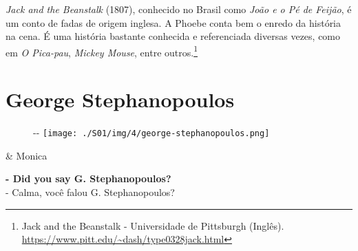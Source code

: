 \emph{Jack and the Beanstalk} (1807), conhecido no Brasil como
\emph{João e o Pé de Feijão}, é um conto de fadas de origem inglesa. A
Phoebe conta bem o enredo da história na cena. É uma história bastante
conhecida e referenciada diversas vezes, como em \emph{O Pica-pau},
\emph{Mickey Mouse}, entre outros.\footnote{\sloppy Jack and the Beanstalk - Universidade de Pittsburgh (Inglês). \url{https://www.pitt.edu/~dash/type0328jack.html}}

\hypertarget{george-stephanopoulos}{%
\section{George Stephanopoulos}\label{george-stephanopoulos}}

\begin{figure}[!ht]
  \begin{adjustwidth}{-\oddsidemargin-1in}{-\rightmargin}
    \centering
    \texttt{[image: ./S01/img/4/george-stephanopoulos.png]}
  \end{adjustwidth}
\end{figure}

\begin{tcolorbox}[enhanced,center upper,
    drop fuzzy shadow southeast, boxrule=0.3pt,
    lower separated=false,
    colframe=black!30!dialogoBorder,colback=white]
\begin{minipage}[c]{0.16\linewidth}
   & \centering \scriptsize{Monica}
\end{minipage}
\hfill
\begin{minipage}[c]{0.8\linewidth}
  \textbf{- Did you say G. Stephanopoulos?}\\
  - Calma, você falou G. Stephanopoulos?
\end{minipage}
\end{tcolorbox}

